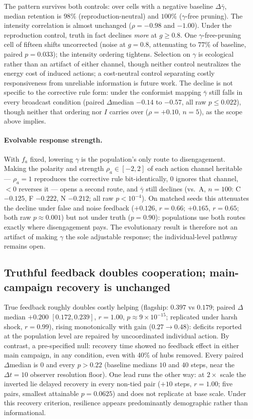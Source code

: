\documentclass{svproc}
\begin{document}
The pattern survives both controls: over cells with a negative baseline
$\Delta\bar\gamma$, median retention is $98\%$ (reproduction-neutral) and
$100\%$ ($\gamma$-free pruning). The intensity
correlation is almost unchanged ($\rho=-0.98$ and $-1.00$). Under the
reproduction control, truth in fact declines \emph{more} at $g\geq0.8$. One $\gamma$-free-pruning cell of fifteen shifts uncorrected (noise at
$g=0.8$, attenuating to $77\%$ of baseline, paired $p=0.033$); the intensity ordering tightens. Selection on $\gamma$ is
ecological rather than an artifact of either channel, though neither control
neutralizes the energy cost of induced actions; a cost-neutral control
separating costly responsiveness from unreliable information is future
work. The decline is not specific to the
corrective rule form: under the conformist mapping $\bar\gamma$ still falls in every
broadcast condition (paired $\Delta$median $-0.14$ to $-0.57$, all
raw $p\leq0.022$), though neither that ordering nor $I$ carries over
($\rho=+0.10$, $n=5$), as the scope above implies.

\paragraph{Evolvable response strength.} With $f_a$ fixed, lowering $\gamma$ is
the population's only route to disengagement. Making the polarity and strength
$\rho_a\in[-2,2]$ of each action channel heritable --- $\rho_a=1$ reproduces the
corrective rule bit-identically, $0$ ignores that channel, ${<}0$ reverses
it --- opens a second route, and $\bar\gamma$ still declines (vs.\ A, $n=100$:
C $-0.125$, F $-0.222$, N $-0.212$; all raw $p<10^{-4}$). On matched seeds
this attenuates the decline under false and noise feedback ($+0.126$,
$r=0.66$; $+0.165$, $r=0.65$; both raw $p\approx0.001$) but not under truth
($p=0.90$): populations use both routes exactly where disengagement pays. The
evolutionary result is therefore not an artifact of making $\gamma$ the sole
adjustable response; the individual-level pathway remains open.

\subsection{Truthful feedback doubles cooperation; main-campaign recovery is unchanged}
True feedback roughly doubles costly helping (flagship: $0.397$ vs $0.179$;
paired $\Delta$median $+0.200$ $[0.172,0.239]$, $r=1.00$,
$p\!\approx\!9\times10^{-15}$; replicated under harsh shock, $r=0.99$),
rising monotonically with gain ($0.27\!\to\!0.48$): deficits reported at the
population level are repaired by uncoordinated individual action. By
contrast, a pre-specified null: recovery time showed no feedback effect in
either main campaign, in any condition, even with 40\% of hubs removed. Every
paired $\Delta$median is $0$ and every $p>0.22$ (baseline medians $10$ and
$40$ steps, near the $\Delta t=10$ observer resolution floor). One lead runs the
other way: at $2\times$ scale the inverted lie delayed recovery in every
non-tied pair ($+10$ steps, $r=1.00$; five pairs, smallest attainable
$p=0.0625$) and does not replicate at base scale.
Under this recovery criterion, resilience appears predominantly demographic
rather than informational.
\end{document}
